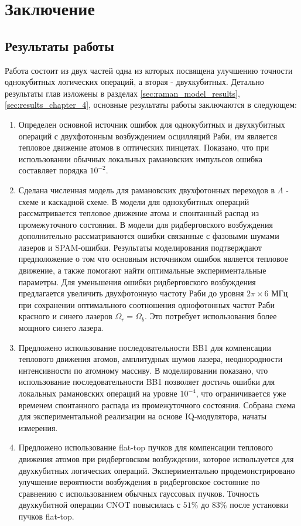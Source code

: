 \section{Заключение}
\label{sec:chapter_5}

\subsection{Результаты работы}

Работа состоит из двух частей одна из которых посвящена улучшению точности однокубитных логических операций, а вторая - двухкубитных. Детально результаты глав изложены в разделах \ref{sec:raman_model_results}, \ref{sec:results_chapter_4}, основные результаты работы заключаются в следующем:

\begin{enumerate}
	\item Определен основной источник ошибок для однокубитных и двухкубитных операций с двухфотонным возбуждением осцилляций Раби, им является тепловое движение атомов в оптических пинцетах. Показано, что при использовании обычных локальных рамановских импульсов ошибка составляет порядка $10^{-2}$.

	\item Сделана численная модель для рамановских двухфотонных переходов в $\Lambda$ - схеме и каскадной схеме. В модели для однокубитных операций рассматривается тепловое движение атома и спонтанный распад из промежуточного состояния. В модели для ридберговского возбуждения дополнительно рассматриваются ошибки связанные с фазовыми шумами лазеров и SPAM-ошибки. Результаты моделирования подтверждают предположение о том что основным источником ошибок является тепловое движение, а также помогают найти оптимальные экспериментальные параметры. Для уменьшения ошибки ридберговского возбуждения предлагается увеличить двухфотонную частоту Раби до уровня $2\pi \times 6 \text{ МГц}$ при сохранении оптимального соотношения однофотонных частот Раби красного и синего лазеров $\Omega_r = \Omega_b$. Это потребует использования более мощного синего лазера.

	\item Предложено использование последовательности BB1 для компенсации теплового движения атомов, амплитудных шумов лазера, неоднородности интенсивности по атомному массиву. В моделировании показано, что использование последовательности BB1 позволяет достичь ошибки для локальных рамановских операций на уровне $10^{-4}$, что ограничивается уже временем спонтанного распада из промежуточного состояния. Собрана схема для экспериментальной реализации на основе IQ-модулятора, начаты измерения.

	\item Предложено использование flat-top пучков для компенсации теплового движения атомов при ридберговском возбуждении, которое используется для двухкубитных логических операций. Экспериментально продемонстрировано улучшение вероятности возбуждения в ридберговское состояние по сравнению с использованием обычных гауссовых пучков. Точность двухкубитной операции CNOT повысилась с $51\%$ до $83\%$ после установки пучков flat-top.
\end{enumerate}

